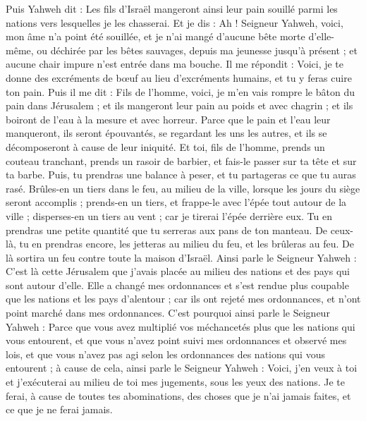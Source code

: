 \begin{multicols}{2}
Puis Yahweh dit : Les fils d'Israël mangeront ainsi leur pain souillé parmi les nations vers lesquelles je les chasserai.
Et je dis : Ah ! Seigneur Yahweh, voici, mon âme n'a point été souillée, et je n'ai mangé d'aucune bête morte d'elle-même, ou déchirée par les bêtes sauvages, depuis ma jeunesse jusqu'à présent ; et aucune chair impure n'est entrée dans ma bouche.
Il me répondit : Voici, je te donne des excréments de bœuf au lieu d’excréments humains, et tu y feras cuire ton pain.
Puis il me dit : Fils de l’homme, voici, je m'en vais rompre le bâton du pain dans Jérusalem ; et ils mangeront leur pain au poids et avec chagrin ; et ils boiront de l'eau à la mesure et avec horreur.
Parce que le pain et l'eau leur manqueront, ils seront épouvantés, se regardant les uns les autres, et ils se décomposeront à cause de leur iniquité.
\VerseOne{}Et toi, fils de l’homme, prends un couteau tranchant,  prends un rasoir de barbier, et fais-le passer sur ta tête et sur ta barbe. Puis, tu prendras une balance à peser, et tu partageras ce que tu auras rasé.
Brûles-en un tiers dans le feu, au milieu de la ville, lorsque les jours du siège seront accomplis ; prends-en un tiers, et frappe-le avec l'épée tout autour de la ville ; disperses-en un tiers au vent ; car je tirerai l'épée derrière eux.
Tu en prendras une petite quantité que tu serreras aux pans de ton manteau.
De ceux-là, tu en prendras encore, les jetteras au milieu du feu, et les brûleras au feu. De là sortira un feu contre toute la maison d'Israël.
Ainsi parle le Seigneur Yahweh : C'est là cette Jérusalem que j'avais placée au milieu des nations et des pays qui sont autour d'elle.
Elle a changé mes ordonnances et s’est rendue plus coupable  que les nations et les pays d’alentour ; car ils ont rejeté mes ordonnances, et n'ont point marché dans mes ordonnances.
C'est pourquoi ainsi parle le Seigneur Yahweh : Parce que vous avez multiplié vos méchancetés plus que les nations qui vous entourent, et que vous n'avez point suivi mes ordonnances et observé mes lois, et que vous n'avez pas agi selon les ordonnances des nations qui vous entourent ;
à cause de cela, ainsi parle le Seigneur Yahweh : Voici, j'en veux à toi et j'exécuterai au milieu de toi mes jugements, sous les yeux des nations.
Je te ferai, à cause de toutes tes abominations, des choses que je n’ai jamais faites,  et ce que je ne ferai jamais.

\end{multicols}
